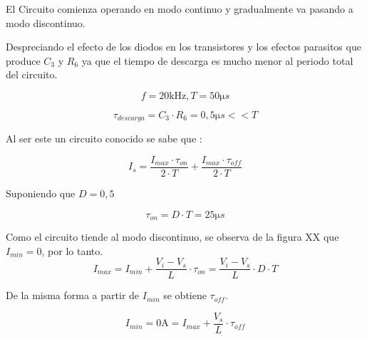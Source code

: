 
El Circuito comienza operando en modo continuo y gradualmente va pasando a modo discontinuo.


Despreciando el efecto de los diodos en los transistores y los efectos parasitos que produce $C_3$ y $R_6$ ya que el tiempo de descarga es mucho menor al periodo total del circuito. 

	\begin{equation}
		f = 20 \si{\kilo\Hz} , T = 50 \si{\micro}s 
	\end{equation}


	\begin{equation}
		\si{\tau}_{descarga} = C_3 \cdot R_6 = 0,5 \si{\micro}s << T
	\end{equation}

Al ser este un circuito conocido se sabe que :

\begin{equation}
 	I_s = \frac{{I_{max} \cdot \si{\tau}_{on}}}{{2 \cdot T}} + \frac{{I_{max} \cdot \si{\tau}_{off}}}{{2 \cdot T}}
 	\label{ec:Is}
\end{equation}

 Suponiendo que $D= 0,5$

\begin{equation}
	\si{\tau}_{on} = D \cdot T = 25\si{\micro}s 
\end{equation}

Como el circuito tiende al modo discontinuo, se observa de la figura XX que $I_{min} = 0$, por lo tanto.
\begin{equation}
 	I_{max} = I_{min} + \frac{{V_{i} - V_{s}}}{L} \cdot \si{\tau}_{on} = \frac{{V_{i} - V_{s}}}{L} \cdot D \cdot T
\end{equation}

De la misma forma a partir de $I_{min}$ se obtiene $\si{\tau}_{off}$.

\begin{equation}
 	I_{min} = 0 \si{\ampere} =  I_{max} + \frac{V_{s} }{L} \cdot \si{\tau}_{off}  
\end{equation}


